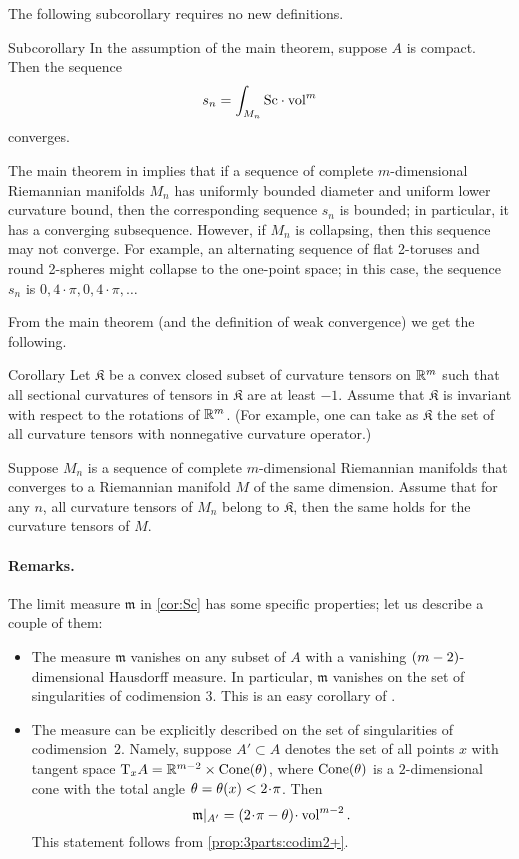 The following subcorollary requires no new definitions.

\begin{thm}{Subcorollary}\label{cor:cor:Sc}
In the assumption of the main theorem, suppose $A$ is compact.
Then the sequence
\[s_n=\int_{M_n}\Sc \cdot\vol^m\]
converges.
\end{thm}

The main theorem in \cite{petrunin-SC} implies that if a sequence of complete $m$-dimensional Riemannian  manifolds $M_n$ has uniformly bounded diameter and uniform lower curvature bound, then 
the corresponding sequence $s_n$ is bounded;
in particular, it has a converging subsequence.
However, if $M_n$ is collapsing, then this sequence may not converge.
For example, an alternating sequence of flat 2-toruses and round 2-spheres might collapse to the one-point space; in this case, the sequence $s_n$ is $0,4\cdot\pi,0,4\cdot\pi,\dots$

From the main theorem (and the definition of weak convergence) we get the following.

\begin{thm}{Corollary}
Let $\mathfrak{K}$ be a convex closed subset of curvature tensors on $\mathbb{R}^m$ 
such that 
all sectional curvatures of tensors in $\mathfrak{K}$ are at least $-1$.
Assume that $\mathfrak{K}$ is invariant with respect to the rotations of $\mathbb{R}^m$.
(For example, one can take as $\mathfrak{K}$ the set of all curvature tensors with nonnegative curvature operator.)

Suppose $M_n$ is a sequence of complete $m$-dimensional Riemannian manifolds that converges to a Riemannian manifold $M$ of the same dimension.
Assume that for any $n$, all curvature tensors of $M_n$ belong to $\mathfrak{K}$, 
then the same holds for the curvature tensors of $M$.
\end{thm}



\paragraph{Remarks.}
The limit measure $\mathfrak m$ in \ref{cor:Sc} has some specific properties;
let us describe a couple of them:
\begin{itemize}
\item The measure $\mathfrak m$ vanishes on any subset of $A$ with a vanishing $(m\zz-2)$-dimensional Hausdorff measure.
In particular, $\mathfrak m$ vanishes on the set of singularities of codimension 3.
This is an easy corollary of \cite{petrunin-SC}.

\item The measure can be explicitly described on the set of singularities
of codimension~$2$.
Namely, suppose $A'\subset A$
denotes the set of all points $x$ with tangent space
$\T_xA\zz=\R^{m-2}\zz\times \Cone(\theta)$,
where $\operatorname{Cone}(\theta)$ is a $2$-dimensional cone
with the total angle $\theta\zz=\theta(x)\zz<2\cdot\pi$.
Then 
$$\mathfrak m|_{A'}=(2\cdot \pi-\theta)\cdot \vol^{m-2}.$$
This statement follows from \ref{prop:3parts:codim2+}.
\end{itemize}


